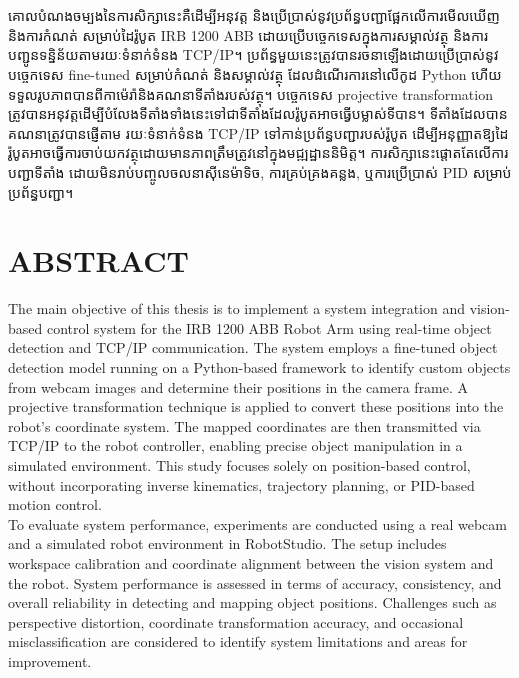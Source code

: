 \documentclass{rithy-thesis}
\begin{document}
\chapter*{}

\begin{khmer}
 \hspace{30pt} គោលបំណងចម្បងនៃការសិក្សានេះគឺដើម្បីអនុវត្ត និងប្រើប្រាស់នូវប្រព័ន្ធបញ្ជាផ្អែកលើការ​មើល​ឃើញនិងការកំណត់ សម្រាប់ដៃរ៉ូបូត IRB 1200 ABB ដោយប្រើបច្ចេកទេសក្នុងការសម្គាល់វត្ថុ និងការបញ្ជូនទន្និន័យតាមរយៈទំនាក់ទំនង TCP/IP។ ប្រព័ន្ធមួយនេះត្រូវបានរចនាឡើងដោយប្រើប្រាស់នូវបច្ចេកទេស fine-tuned សម្រាប់កំណត់ និងសម្គាល់វត្ថុ ដែលដំណើរការនៅលើកូដ Python ហើយទទួលរូបភាពបានពីកាម៉េរ៉ានិងគណនាទីតាំងរបស់វត្ថុ។ បច្ចេកទេស projective transformation ត្រូវបានអនុវត្តដើម្បីបំលែងទីតាំងទាំងនេះទៅជាទីតាំងដែលរ៉ូបូតអាចធ្វើបម្លាស់ទីបាន។ ទីតាំងដែលបានគណនាត្រូវបានផ្ញើតាម រយៈទំនាក់ទំនង TCP/IP ទៅកាន់ប្រព័ន្ធបញ្ជារបស់រ៉ូបូត ដើម្បីអនុញ្ញាតឱ្យដៃរ៉ូបូតអាចធ្វើការចាប់យកវត្ថុដោយមានភាពត្រឹមត្រូវនៅក្នុងមជ្ឍដ្ឋាននិមិត្ត។ ការសិក្សានេះផ្តោតតែលើការបញ្ជាទីតាំង ដោយមិនរាប់បញ្ចូលចលនាស៊ីនេម៉ាទិច, ការគ្រប់គ្រងគន្លង, ឬការប្រើប្រាស់ PID សម្រាប់ប្រព័ន្ធបញ្ជា។
\end{khmer}

\chapter*{ABSTRACT}

The main objective of this thesis is to implement a system integration and vision-based control system for the IRB 1200 ABB Robot Arm using real-time object detection and TCP/IP communication. The system employs a fine-tuned object detection model running on a Python-based framework to identify custom objects from webcam images and determine their positions in the camera frame. A projective transformation technique is applied to convert these positions into the robot’s coordinate system. The mapped coordinates are then transmitted via TCP/IP to the robot controller, enabling precise object manipulation in a simulated environment. This study focuses solely on position-based control, without incorporating inverse kinematics, trajectory planning, or PID-based motion control. \\

To evaluate system performance, experiments are conducted using a real webcam and a simulated robot environment in RobotStudio. The setup includes workspace calibration and coordinate alignment between the vision system and the robot. System performance is assessed in terms of accuracy, consistency, and overall reliability in detecting and mapping object positions. Challenges such as perspective distortion, coordinate transformation accuracy, and occasional misclassification are considered to identify system limitations and areas for improvement. \\
\end{document}
